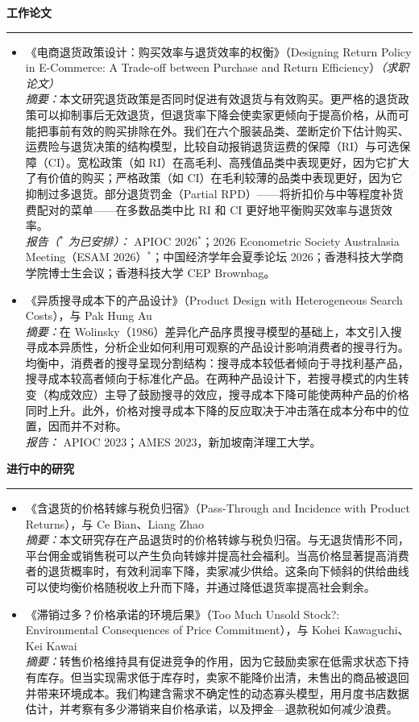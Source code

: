 \documentclass[11pt,letterpaper]{article}
\newcommand{\sectionheader}[1]{%
  \vspace{0.45em}
  {\large\bfseries #1}\\[-0.15em]
  \rule{\textwidth}{0.4pt}\par
  \vspace{0.2em}
}
\begin{document}
\vspace{-0.4em}
\sectionheader{工作论文}
\begin{itemize}
  \item 《电商退货政策设计：购买效率与退货效率的权衡》（Designing Return Policy in E-Commerce: A Trade-off between Purchase and Return Efficiency）\textit{（求职论文）}\\[0.15em]
  \textit{摘要：}本文研究退货政策是否同时促进有效退货与有效购买。更严格的退货政策可以抑制事后无效退货，但退货率下降会使卖家更倾向于提高价格，从而可能把事前有效的购买排除在外。我们在六个服装品类、垄断定价下估计购买、运费险与退货决策的结构模型，比较自动报销退货运费的保障（RI）与可选保障（CI）。宽松政策（如 RI）在高毛利、高残值品类中表现更好，因为它扩大了有价值的购买；严格政策（如 CI）在毛利较薄的品类中表现更好，因为它抑制过多退货。部分退货罚金（Partial RPD）——将折扣价与中等程度补货费配对的菜单——在多数品类中比 RI 和 CI 更好地平衡购买效率与退货效率。\\[0.15em]
  \textit{报告（$^{\ast}$ 为已安排）：} APIOC 2026$^{\ast}$；2026 Econometric Society Australasia Meeting（ESAM 2026）$^{\ast}$；中国经济学年会夏季论坛 2026；香港科技大学商学院博士生会议；香港科技大学 CEP Brownbag。

  \item 《异质搜寻成本下的产品设计》（Product Design with Heterogeneous Search Costs），与 Pak Hung Au\\[0.15em]
  \textit{摘要：}在 Wolinsky（1986）差异化产品序贯搜寻模型的基础上，本文引入搜寻成本异质性，分析企业如何利用可观察的产品设计影响消费者的搜寻行为。均衡中，消费者的搜寻呈现分割结构：搜寻成本较低者倾向于寻找利基产品，搜寻成本较高者倾向于标准化产品。在两种产品设计下，若搜寻模式的内生转变（构成效应）主导了鼓励搜寻的效应，搜寻成本下降可能使两种产品的价格同时上升。此外，价格对搜寻成本下降的反应取决于冲击落在成本分布中的位置，因而并不对称。\\[0.15em]
  \textit{报告：} APIOC 2023；AMES 2023，新加坡南洋理工大学。
\end{itemize}

\sectionheader{进行中的研究}
\begin{itemize}
  \item 《含退货的价格转嫁与税负归宿》（Pass-Through and Incidence with Product Returns），与 Ce Bian、Liang Zhao\\[0.15em]
  \textit{摘要：}本文研究存在产品退货时的价格转嫁与税负归宿。与无退货情形不同，平台佣金或销售税可以产生负向转嫁并提高社会福利。当高价格显著提高消费者的退货概率时，有效利润率下降，卖家减少供给。这条向下倾斜的供给曲线可以使均衡价格随税收上升而下降，并通过降低退货率提高社会剩余。
  \item 《滞销过多？价格承诺的环境后果》（Too Much Unsold Stock?: Environmental Consequences of Price Commitment），与 Kohei Kawaguchi、Kei Kawai\\[0.15em]
  \textit{摘要：}转售价格维持具有促进竞争的作用，因为它鼓励卖家在低需求状态下持有库存。但当实现需求低于库存时，卖家不能降价出清，未售出的商品被退回并带来环境成本。我们构建含需求不确定性的动态寡头模型，用月度书店数据估计，并考察有多少滞销来自价格承诺，以及押金—退款税如何减少浪费。
\end{itemize}
\end{document}
